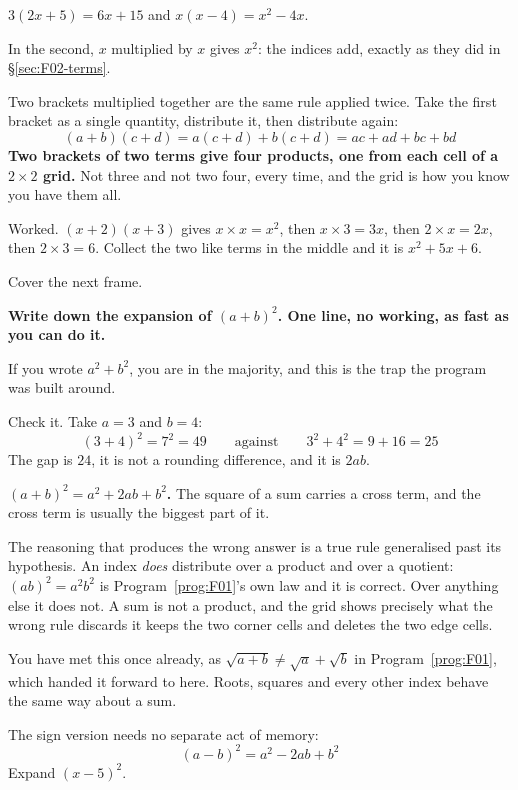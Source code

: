 \begin{fr}
\begin{ansblock}
$3(2x + 5) = 6x + 15$ \quad and \quad $x(x - 4) = x^{2} - 4x$.

In the second, $x$ multiplied by $x$ gives $x^{2}$: the indices add, exactly as
they did in \S\ref{sec:F02-terms}.
\end{ansblock}

Two brackets multiplied together are the same rule applied twice. Take the
first bracket as a single quantity, distribute it, then distribute again:
\[ (a + b)(c + d) = a(c + d) + b(c + d) = ac + ad + bc + bd \]
\textbf{Two brackets of two terms give four products, one from each cell of a
$2 \times 2$ grid.} Not three and not two \dash{} four, every time, and the
grid is how you know you have them all.

Worked. $(x + 2)(x + 3)$ gives $x \times x = x^{2}$, then $x \times 3 = 3x$,
then $2 \times x = 2x$, then $2 \times 3 = 6$. Collect the two like terms in
the middle and it is $x^{2} + 5x + 6$.
\end{fr}

\begin{fr}
Cover the next frame.

\textbf{Write down the expansion of $(a + b)^{2}$. One line, no working, as
fast as you can do it.}
\dotline
\nextframe
\end{fr}

\begin{fr}
\begin{ansblock}
If you wrote $a^{2} + b^{2}$, you are in the majority, and this is the trap the
program was built around.

Check it. Take $a = 3$ and $b = 4$:
\[ (3 + 4)^{2} = 7^{2} = 49 \qquad \text{against} \qquad
   3^{2} + 4^{2} = 9 + 16 = 25 \]
The gap is $24$, it is not a rounding difference, and it is $2ab$.
\end{ansblock}

\begin{trapbox}
\textbf{$(a+b)^{2} = a^{2} + 2ab + b^{2}$.} The square of a sum carries a cross
term, and the cross term is usually the biggest part of it.

The reasoning that produces the wrong answer is a true rule generalised past
its hypothesis. An index \emph{does} distribute over a product and over a
quotient: $(ab)^{2} = a^{2}b^{2}$ is Program~\ref{prog:F01}'s own law and it is
correct. Over anything else it does not. A sum is not a product, and the grid
shows precisely what the wrong rule discards \dash{} it keeps the two corner
cells and deletes the two edge cells.

You have met this once already, as
$\sqrt{a + b} \ne \sqrt{a} + \sqrt{b}$ in Program~\ref{prog:F01}, which handed
it forward to here. Roots, squares and every other index behave the same way
about a sum.
\end{trapbox}
The sign version needs no separate act of memory:
\[ (a - b)^{2} = a^{2} - 2ab + b^{2} \]
Expand $(x - 5)^{2}$.
\nextframe
\end{fr}

